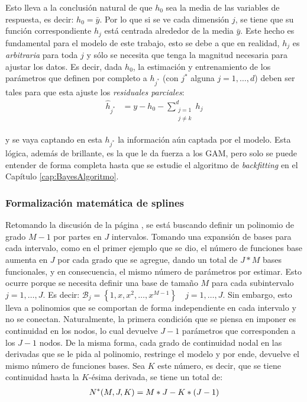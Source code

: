\documentclass[../Main/Main.tex]{subfiles}
\begin{document}
Esto lleva a la conclusión natural de que $h_0$ sea la media de las variables de respuesta, es decir: $h_0 = \bar{y}$. Por lo que si se ve cada dimensión $j$, se tiene que su función correspondiente $h_j$ está centrada alrededor de la media $\bar{y}$. Este hecho es fundamental para el modelo de este trabajo, esto se debe a que en realidad, $h_j$ es \textit{arbitraria} para toda $j$ y sólo se necesita que tenga la magnitud necesaria para ajustar los datos. Es decir, dada $h_0$, la estimación y entrenamiento de los parámetros que definen por completo a $h_{j^*}$ (con $j^*$ alguna $j=1,\ldots,d$) deben ser tales para que esta ajuste los \textit{residuales parciales}:
\begin{align}
\hat{h}_{j^*} &= y - h_0 - \sum_{\substack{j=1\\ j \neq k}}^d h_j \label{ec:ResParciales}
\end{align}

y se vaya captando en esta $h_{j^*}$ la información aún captada por el modelo. Esta lógica, además de brillante, es la que le da fuerza a los GAM, pero solo se puede entender de forma completa hasta que se estudie el algoritmo de \textit{backfitting} en el Capítulo \ref{cap:BayesAlgoritmo}. \\

\subsubsection{Formalización matemática de splines}
Retomando la discusión de la página \pageref{sec:PolisYSplines}, se está buscando definir un polinomio de grado $M-1$ por partes en $J$ intervalos. Tomando una expansión de bases para cada intervalo, como en el primer ejemplo que se dio, el número de funciones base aumenta en $J$ por cada grado que se agregue, dando un total de $J*M$ bases funcionales, y en consecuencia, el mismo número de parámetros por estimar. Esto ocurre porque se necesita definir una base de tamaño $M$ para cada subintervalo $j = 1,\ldots,J$. Es decir: $\mathcal{B}_j = \left\{1,x,x^2,\ldots,x^{M-1}\right\} \quad j = 1,\ldots,J$. Sin embargo, esto lleva a polinomios que se comportan de forma independiente en cada intervalo y no se conectan. Naturalmente, la primera condición que se piensa en imponer es continuidad en los nodos, lo cual devuelve $J-1$ parámetros que corresponden a los $J-1$ nodos. De la misma forma, cada grado de continuidad nodal en las derivadas que se le pida al polinomio, restringe el modelo y por ende, devuelve el mismo número de funciones bases. Sea $K$ este número, es decir, que se tiene continuidad hasta la $K$-ésima derivada, se tiene un total de:
\begin{align}
	N^*(M,J,K) = M*J - K*(J-1) \label{ec:NEstrella}
\end{align}
\end{document}
